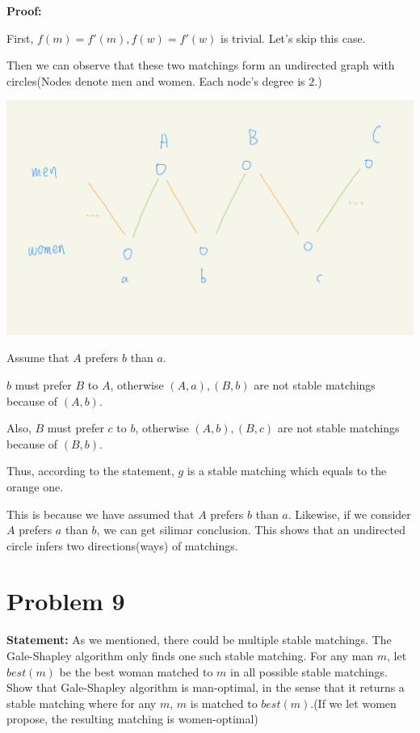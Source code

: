 \documentclass[12 pt]{article}
\begin{document}
\textbf{Proof: }

First, $f(m) = f'(m), f(w) = f'(w)$ is trivial. Let's skip this case.

Then we can observe that these two matchings form an undirected graph with circles(Nodes denote men and women. Each node's degree is $2$.)

\includegraphics[width=\linewidth]{P8_1.jpeg}

Assume that $A$ prefers $b$ than $a$.

$b$ must prefer $B$ to $A$, otherwise $(A, a), (B, b)$ are not stable matchings because of $(A, b)$.

Also, $B$ must prefer $c$ to $b$, otherwise $(A, b), (B, c)$ are not stable matchings because of $(B, b)$.

Thus, according to the statement, $g$ is a stable matching which equals to the orange one.

This is because we have assumed that $A$ prefers $b$ than $a$. Likewise, if we consider $A$ prefers $a$ than $b$, we can get silimar conclusion. This shows that an undirected circle infers two directions(ways) of matchings.

\section{Problem 9}

\textbf{Statement: } As we mentioned, there could be multiple stable matchings. The Gale-Shapley algorithm only finds one such stable matching. For any man $m$, let $best(m)$ be the best woman matched to $m$ in all possible stable matchings. Show that Gale-Shapley algorithm is man-optimal, in the sense that it returns a stable matching where for any $m$, $m$ is matched to $best(m)$.(If we let women propose, the resulting matching is women-optimal)
\end{document}
